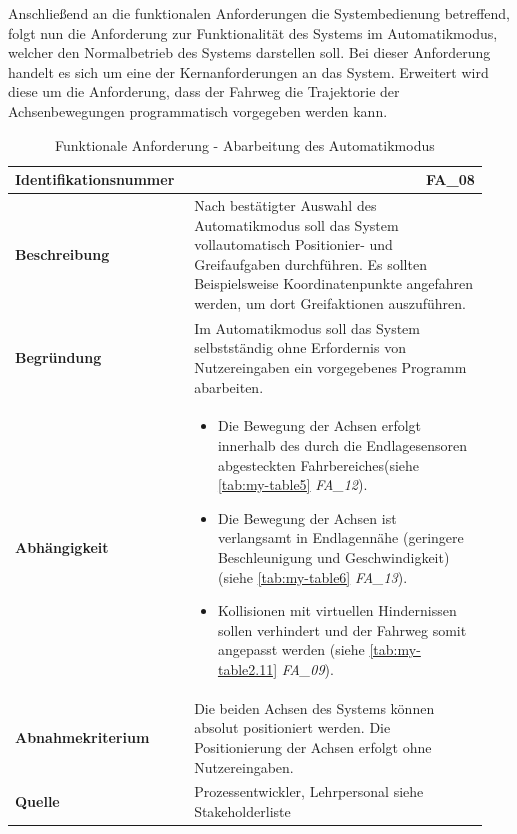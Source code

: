 \documentclass[../../../Bachelorarbeit.tex]{subfiles}
\begin{document}
Anschließend an die funktionalen Anforderungen die Systembedienung betreffend, folgt nun die Anforderung zur Funktionalität des Systems im Automatikmodus, welcher den Normalbetrieb des Systems darstellen soll. Bei dieser Anforderung handelt es sich um eine der Kernanforderungen an das System. Erweitert wird diese um die Anforderung, dass der Fahrweg \bzw die Trajektorie der Achsenbewegungen programmatisch vorgegeben werden kann.

\begin{table}[H]
    \centering
    \begin{tabular}{ p{0.34\linewidth}  p{0.6\linewidth} } 
        \hline
        \textbf{Identifikationsnummer}  & \multicolumn{1}{r}{FA\_08} \\ \hline
        \textbf{Beschreibung}           & Nach bestätigter Auswahl des Automatikmodus soll das System vollautomatisch Positionier- und Greifaufgaben durchführen. Es sollten Beispielsweise Koordinatenpunkte angefahren werden, um dort Greifaktionen auszuführen. \\
        \textbf{Begründung}             & Im Automatikmodus soll das System selbstständig ohne Erfordernis von Nutzereingaben ein vorgegebenes Programm abarbeiten. \\
        \textbf{Abhängigkeit}           &   {\begin{itemize}[noitemsep,topsep=0pt,parsep=0pt,partopsep=0pt,leftmargin=*]
                                                \item Die Bewegung der Achsen erfolgt innerhalb des durch die Endlagesensoren abgesteckten Fahrbereiches(siehe \autoref{tab:my-table5} \textit{FA\_12}).
                                                \item Die Bewegung der Achsen ist verlangsamt in Endlagennähe (geringere Beschleunigung und Geschwindigkeit) (siehe \autoref{tab:my-table6} \textit{FA\_13}).
                                                \item Kollisionen mit virtuellen Hindernissen sollen verhindert und der Fahrweg somit angepasst werden (siehe \autoref{tab:my-table2.11} \textit{FA\_09}).
                                            \end{itemize}} \\
        \textbf{Abnahmekriterium}       & Die beiden Achsen des Systems können absolut positioniert werden. Die Positionierung der Achsen erfolgt ohne Nutzereingaben. \\
        \textbf{Quelle}                 & Prozessentwickler, Lehrpersonal siehe Stakeholderliste \\ \hline
    \end{tabular}
    \caption[\acs{fa} - Abarbeitung Automatikmodus]{Funktionale Anforderung - Abarbeitung des Automatikmodus}
    \label{tab:my-table2.10}
\end{table}
\end{document}
